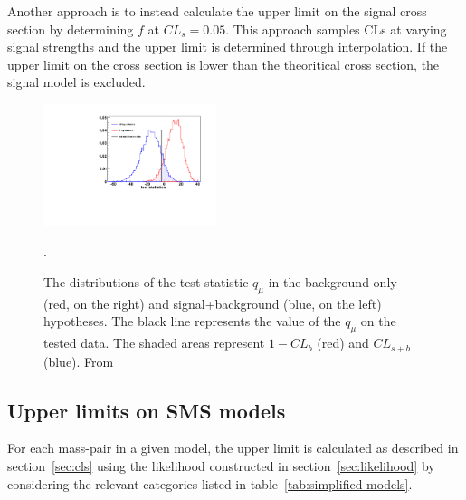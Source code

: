Another approach is to instead calculate the upper limit on the signal 
cross section by determining $f$ at $CL_{s} = 0.05$.  This approach samples 
CLs at varying signal strengths and the upper limit is 
determined through interpolation. If the upper limit on the cross section 
is lower than the theoritical cross section, the signal model is excluded.

\begin{figure}[h!t]
  \begin{center}
      \includegraphics[width=0.45\textwidth,]{figures/hybrid_plot}
      \caption{\label{fig:hybrid_plot} The distributions of the test statistic $q_{\mu}$
        in the background-only (red, on the right) and signal+background (blue, on the left) hypotheses. 
        The black line represents the value of the $q_{\mu}$ on the tested data. The shaded areas represent 
        $1-CL_{b}$ (red) and $CL_{s+b}$ (blue).  From~\cite{Moneta:1289965}}.
    \label{fig:hybrid_plot}
  \end{center}
\end{figure}


\subsection{Upper limits on SMS models}

For each mass-pair in a given model, the upper limit is calculated as described in 
section~\ref{sec:cls} using the likelihood constructed in section~\ref{sec:likelihood}
by considering the relevant categories listed in table~\ref{tab:simplified-models}.

